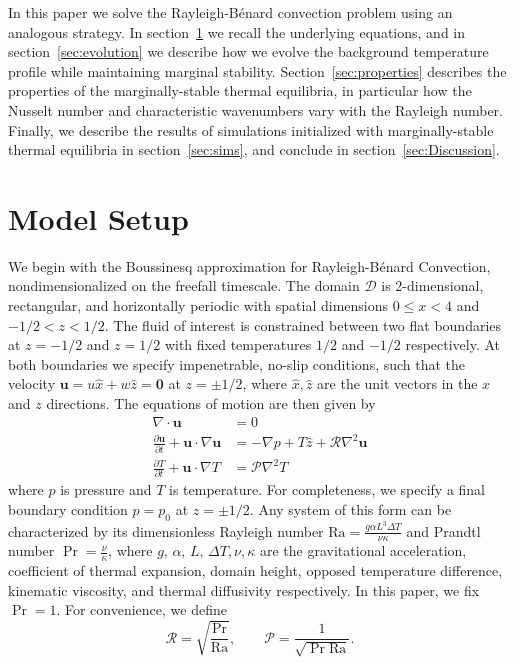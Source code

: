 \documentclass[reprint,amsmath,amssymb,aps]{revtex4-1}
\newcommand\Ra{\mathrm{Ra}}
\renewcommand{\vec}[1]{\boldsymbol{#1}}
\begin{document}
In this paper we solve the Rayleigh-B\'{e}nard convection problem using an analogous strategy.
In section~\ref{sec:model} we recall the underlying equations, and in section~\ref{sec:evolution} we describe how we evolve the background temperature profile while maintaining marginal stability.
Section~\ref{sec:properties} describes the properties of the marginally-stable thermal equilibria, in particular how the Nusselt number and characteristic wavenumbers vary with the Rayleigh number.
Finally, we describe the results of simulations initialized with marginally-stable thermal equilibria in section~\ref{sec:sims}, and conclude in section~\ref{sec:Discussion}.
 
\section{Model Setup}\label{sec:model}
We begin with the Boussinesq approximation for Rayleigh-Bénard Convection, nondimensionalized on the freefall timescale. 
The domain $\mathcal{D}$ is 2-dimensional, rectangular, and horizontally periodic with spatial dimensions $0 \leq x < 4$ and $-1/2 < z < 1/2$. 
The fluid of interest is constrained between two flat boundaries at $z = -1/2$ and $z = 1/2$ with fixed temperatures $1/2$ and $-1/2$ respectively. 
At both boundaries we specify impenetrable, no-slip conditions, such that the velocity $\vec{u} = u \hat{x} + w \hat{z} = \vec{0}$ at $z = \pm 1/2$, where $\hat{x}, \hat{z}$ are the unit vectors in the $x$ and $z$ directions. 
The equations of motion are then given by
\begin{align}
    \nabla \cdot \vec{u} &= 0 \label{EQ:motion1}\\
    \frac{\partial \vec{u}}{\partial t} + \vec{u} \cdot \nabla \vec{u} &= - \nabla p + T \hat{z} + \mathcal{R} \nabla^2 \vec{u} \label{EQ:motion2}\\
    \frac{\partial T}{\partial t} + \vec{u} \cdot \nabla T &= \mathcal{P} \nabla^2 T \label{EQ:motion3}
\end{align}
where $p$ is pressure and $T$ is temperature. 
For completeness, we specify a final boundary condition $p = p_0$ at $z = \pm 1/2$. 
Any system of this form can be characterized by its dimensionless Rayleigh number $\Ra = \frac{g\alpha L^3 \Delta T}{\nu \kappa}$ and Prandtl number $\Pr = \frac{\nu}{\kappa}$, where $g, \, \alpha, \, L, \, \Delta T, \nu, \kappa$ are the gravitational acceleration, coefficient of thermal expansion, domain height, opposed temperature difference, kinematic viscosity, and thermal diffusivity respectively. 
In this paper, we fix $\Pr = 1$.
For convenience, we define
\begin{equation}
\mathcal{R} = \sqrt{\frac{\Pr}{\Ra}}, \qquad \mathcal{P} = \frac{1}{\sqrt{\Pr \Ra}}.
\end{equation}
\end{document}

